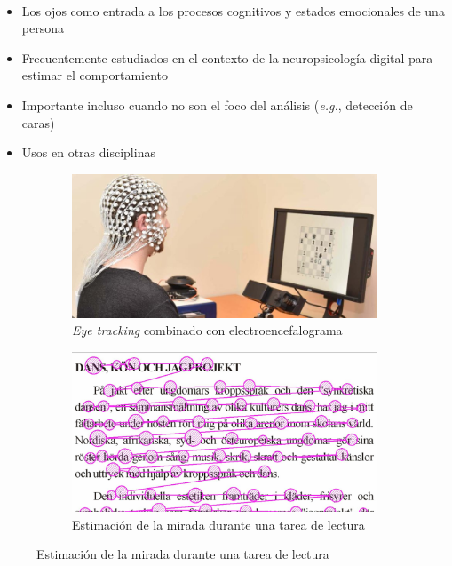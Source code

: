 \documentclass[aspectratio=169]{beamer}
\begin{document}
\begin{frame}{~}

  \begin{itemize}
      \item Los ojos como entrada a los procesos cognitivos y estados
        emocionales de una persona
      \item Frecuentemente estudiados en el contexto de la neuropsicología
        digital para estimar el comportamiento
      \item Importante incluso cuando no son el foco del análisis
        (\textit{e.g.}, detección de caras)
      \item Usos en otras disciplinas
  \end{itemize}

  \begin{figure}
    \begin{subfigure}{0.49\textwidth}
      \centering
      \includegraphics[width=\linewidth]{img/eye-link-eeg.jpg}
      \caption{\textit{Eye tracking} combinado con electroencefalograma}
    \end{subfigure}
    \begin{subfigure}{0.49\textwidth}
      \centering
      \includegraphics[width=\linewidth]{img/reading-fixations-saccades.jpg}
      \caption{Estimación de la mirada durante una tarea de lectura}
    \end{subfigure}
  \end{figure}

\end{frame}
\end{document}
